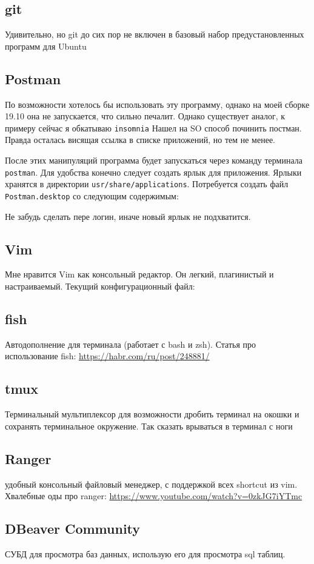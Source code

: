 \documentclass[a4paper, 12pt]{report}
\begin{document}
\subsection{git} Удивительно, но git до сих пор не включен в базовый набор предустановленных программ для Ubuntu
\subsection{Postman} По возможности хотелось бы использовать эту программу, однако на моей сборке 19.10 она не запускается, что сильно печалит. Однако существует аналог, к примеру сейчас я обкатываю \lstinline|insomnia|
Нашел на SO способ починить постман. Правда осталась висящая ссылка в списке приложений, но тем не менее.

После этих манипуляций программа будет запускаться через команду терминала \lstinline|postman|. Для удобства конечно следует создать ярлык для приложения.
Ярлыки хранятся в директории \lstinline|usr/share/applications|. Потребуется создать файл \lstinline|Postman.desktop| со следующим содержимым:

Не забудь сделать пере логин, иначе новый ярлык не подхватится.
\subsection{Vim} Мне нравится Vim как консольный редактор. Он легкий, плагинистый и настраиваемый. Текущий конфигурационный файл:

\subsection{fish} Автодополнение для терминала (работает с bash и zsh). 
Статья про использование fish: \href{https://habr.com/ru/post/248881/}{https://habr.com/ru/post/248881/}
\subsection{tmux} Терминальный мультиплексор для возможности дробить терминал на окошки и сохранять терминальное окружение. Так сказать врываться в терминал с ноги
\subsection{Ranger} удобный консольный файловый менеджер, с поддержкой всех shortcut из vim. Хвалебные оды про ranger:  \href{https://www.youtube.com/watch?v=0zkJG7iYTmc}{https://www.youtube.com/watch?v=0zkJG7iYTmc}
\subsection{DBeaver Community} СУБД для просмотра баз данных, использую его для просмотра sql таблиц.
\end{document}
